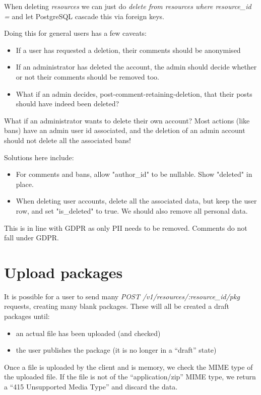 \documentclass[bsc,frontabs,twoside,singlespacing,parskip,deptreport]{infthesis}     %
\begin{document}
When deleting \emph{resources} we can just do \emph{delete from resources where resource\_id = }
and let PostgreSQL cascade this via foreign keys.

Doing this for general users has a few caveats:
\begin{itemize}
  \item If a user has requested a deletion, their comments should be anonymised
  \item If an administrator has deleted the account,
        the admin should decide whether or not their comments should be removed too.
  \item What if an admin decides, post-comment-retaining-deletion, that their posts should have indeed been deleted?
\end{itemize}

What if an administrator wants to delete their own account? Most actions (like bans) have an
admin user id associated, and the deletion of an admin account should not delete all the associated bans!

Solutions here include:

\begin{itemize}
  \item For comments and bans, allow "author\_id" to be nullable. Show "deleted" in place.
  \item When deleting user accounts, delete all the associated data, but keep the user row, and set "is\_deleted" to true. We should also remove all personal data.
\end{itemize}

This is in line with GDPR as only PII needs to be removed. Comments do not fall under GDPR.


\section{Upload packages}

It is possible for a user to send many \emph{POST /v1/resources/:resource\_id/pkg} requests, creating many blank packages. These will all be created a draft packages until:

\begin{itemize}
  \item an actual file has been uploaded (and checked)
  \item the user publishes the package (it is no longer in a ``draft'' state)
\end{itemize}

Once a file is uploaded by the client and is memory, we check the MIME type of the uploaded file. If the file is not of the ``application/zip'' MIME type, we return a ``415 Unsupported Media Type'' and discard the data.
\end{document}
